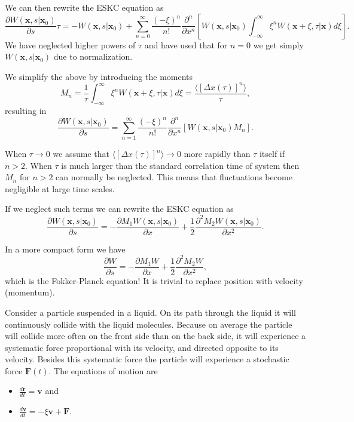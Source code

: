 We can then rewrite the ESKC equation as 
\[
\frac{\partial W(\mathbf{x},s|\mathbf{x}_0)}{\partial s}\tau=-W(\mathbf{x},s|\mathbf{x}_0)+
\sum_{n=0}^{\infty}\frac{(-\xi)^n}{n!}\frac{\partial^n}{\partial x^n}
\left[W(\mathbf{x},s|\mathbf{x}_0)\int_{-\infty}^{\infty} \xi^nW(\mathbf{x}+\xi,\tau|\mathbf{x})d\xi\right].
\]
We have neglected higher powers of $\tau$ and have used that for $n=0$ 
we get simply $W(\mathbf{x},s|\mathbf{x}_0)$ due to normalization.

We simplify the above by introducing the moments 
\[
M_n=\frac{1}{\tau}\int_{-\infty}^{\infty} \xi^nW(\mathbf{x}+\xi,\tau|\mathbf{x})d\xi=
\frac{\langle [\Delta x(\tau)]^n\rangle}{\tau},
\]
resulting in
\[
\frac{\partial W(\mathbf{x},s|\mathbf{x}_0)}{\partial s}=
\sum_{n=1}^{\infty}\frac{(-\xi)^n}{n!}\frac{\partial^n}{\partial x^n}
\left[W(\mathbf{x},s|\mathbf{x}_0)M_n\right].
\]

When $\tau \rightarrow 0$ we assume that $\langle [\Delta x(\tau)]^n\rangle \rightarrow 0$ more rapidly than $\tau$ itself if $n > 2$. 
When $\tau$ is much larger than the standard correlation time of 
system then $M_n$ for $n > 2$ can normally be neglected.
This means that fluctuations become negligible at large time scales.

If we neglect such terms we can rewrite the ESKC equation as 
\[
\frac{\partial W(\mathbf{x},s|\mathbf{x}_0)}{\partial s}=
-\frac{\partial M_1W(\mathbf{x},s|\mathbf{x}_0)}{\partial x}+
\frac{1}{2}\frac{\partial^2 M_2W(\mathbf{x},s|\mathbf{x}_0)}{\partial x^2}.
\]

In a more compact form we have
\[
\frac{\partial W}{\partial s}=
-\frac{\partial M_1W}{\partial x}+
\frac{1}{2}\frac{\partial^2 M_2W}{\partial x^2},
\]
which is the Fokker-Planck equation!  It is trivial to replace 
position with velocity (momentum).

Consider a particle  suspended in a liquid. On its path through the liquid it will continuously collide with the liquid molecules. Because on average the particle  will collide more often on the front side than on the back side, it will experience a systematic force proportional with its velocity, and directed opposite to its velocity. Besides this systematic force the particle  will experience a stochastic force  $\mathbf{F}(t)$. 
The equations of motion are 
\begin{itemize}
\item $\frac{d\mathbf{r}}{dt}=\mathbf{v}$ and 

\item $\frac{d\mathbf{v}}{dt}=-\xi \mathbf{v}+\mathbf{F}$.
\end{itemize}


